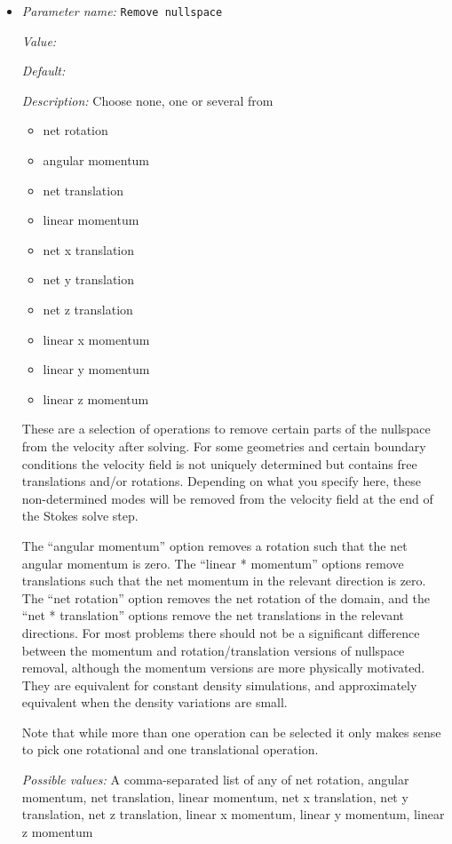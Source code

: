 \begin{itemize}
\item {\it Parameter name:} {\tt Remove nullspace}
\label{parameters:Nullspace removal/Remove nullspace}


{\it Value:} 


{\it Default:} 


{\it Description:} Choose none, one or several from 

\begin{itemize} \item net rotation \item angular momentum \item net translation \item linear momentum \item net x translation \item net y translation \item net z translation \item linear x momentum \item linear y momentum \item linear z momentum \end{itemize}

These are a selection of operations to remove certain parts of the nullspace from the velocity after solving. For some geometries and certain boundary conditions the velocity field is not uniquely determined but contains free translations and/or rotations. Depending on what you specify here, these non-determined modes will be removed from the velocity field at the end of the Stokes solve step.


The ``angular momentum'' option removes a rotation such that the net angular momentum is zero. The ``linear * momentum'' options remove translations such that the net momentum in the relevant direction is zero.  The ``net rotation'' option removes the net rotation of the domain, and the ``net * translation'' options remove the net translations in the relevant directions.  For most problems there should not be a significant difference between the momentum and rotation/translation versions of nullspace removal, although the momentum versions are more physically motivated. They are equivalent for constant density simulations, and approximately equivalent when the density variations are small.

Note that while more than one operation can be selected it only makes sense to pick one rotational and one translational operation.


{\it Possible values:} A comma-separated list of any of net rotation, angular momentum, net translation, linear momentum, net x translation, net y translation, net z translation, linear x momentum, linear y momentum, linear z momentum
\end{itemize}


